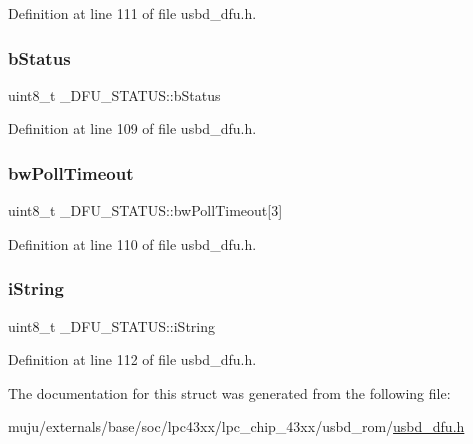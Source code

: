 Definition at line 111 of file usbd\+\_\+dfu.\+h.

\mbox{\label{struct___d_f_u___s_t_a_t_u_s_a119f8cd204d5cac52dc10c5a05847c11}} 
\subsubsection{\texorpdfstring{b\+Status}{bStatus}}
{\footnotesize\ttfamily uint8\+\_\+t \+\_\+\+D\+F\+U\+\_\+\+S\+T\+A\+T\+U\+S\+::b\+Status}



Definition at line 109 of file usbd\+\_\+dfu.\+h.

\mbox{\label{struct___d_f_u___s_t_a_t_u_s_acb250abf9daba1a07c7ec98cb0e89bfe}} 
\subsubsection{\texorpdfstring{bw\+Poll\+Timeout}{bwPollTimeout}}
{\footnotesize\ttfamily uint8\+\_\+t \+\_\+\+D\+F\+U\+\_\+\+S\+T\+A\+T\+U\+S\+::bw\+Poll\+Timeout\mbox{[}3\mbox{]}}



Definition at line 110 of file usbd\+\_\+dfu.\+h.

\mbox{\label{struct___d_f_u___s_t_a_t_u_s_ab486ff4ce617b2808ec80d0188403aab}} 
\subsubsection{\texorpdfstring{i\+String}{iString}}
{\footnotesize\ttfamily uint8\+\_\+t \+\_\+\+D\+F\+U\+\_\+\+S\+T\+A\+T\+U\+S\+::i\+String}



Definition at line 112 of file usbd\+\_\+dfu.\+h.



The documentation for this struct was generated from the following file\+:\begin{DoxyCompactItemize}
\item 
muju/externals/base/soc/lpc43xx/lpc\+\_\+chip\+\_\+43xx/usbd\+\_\+rom/\hyperlink{usbd__dfu_8h}{usbd\+\_\+dfu.\+h}\end{DoxyCompactItemize}
